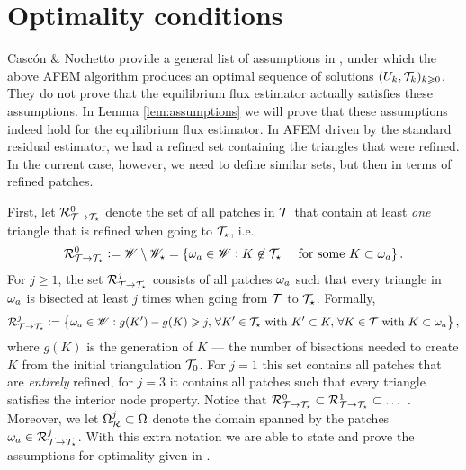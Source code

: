 \documentclass[thesis.tex]{subfiles}
\begin{document}
\section{Optimality conditions}
Casc\'on \& Nochetto provide a general list of assumptions in \cite[\S 4]{cascon2012}, under which the above AFEM algorithm produces
an optimal sequence of solutions $(U_k, \mathcal{T}_k)_{k \geqslant 0}$.
They do not prove that the equilibrium flux estimator actually  satisfies these assumptions.
In Lemma \ref{lem:assumptions} we will prove that these
assumptions indeed hold for the equilibrium flux estimator.
In AFEM driven by the standard residual estimator, we had a refined set containing the triangles that were refined.
In the current case, however, we need to define similar sets, but then in terms of refined patches.

First, let $\mathcal{R}^0_{\mathcal{T} \to \mathcal{T}_\star}$ denote the set of all patches in $\mathcal{T}$ that contain at least \emph{one} triangle that is refined when going to $\mathcal{T}_\star$, i.e.
\[
\mathcal{R}^0_{\mathcal{T} \to \mathcal{T}_\star} := \mathscr{W} \setminus \mathscr{W}_\star =  \set{ \omega_a \in \mathscr{W}:  K \not \in \mathcal{T}_\star\quad \text{ for some }  K \subset \omega_a}.
\]
For $j \geq 1$, the set $\mathcal{R}^j_{\mathcal{T} \to \mathcal{T}_\star}$ consists of all patches $\omega_a$ such that every triangle in $\omega_a$ is bisected at least $j$  times when going from $\mathcal{T}$ to $\mathcal{T}_\star$.
Formally, 
\[
  \mathcal{R}^j_{\mathcal{T} \to \mathcal{T}_\star} := \set{ \omega_a \in \mathscr{W}: g(K') - g(K) \geqslant j,  \, \forall K' \in \mathcal{T}_\star \text{ with } K' \subset K, \, \forall K \in \mathcal{T}\text{ with } K \subset \omega_a},
\]
where $g(K)$ is the generation of $K$ --- the number of bisections needed to create $K$ from the initial triangulation $\mathcal{T}_0$. For $j=1$ this set contains
all patches that are \emph{entirely} refined, for $j=3$ it contains all patches such that every triangle satisfies the interior node property.
Notice that $\mathcal{R}^0_{\mathcal{T} \to \mathcal{T}_\star} \subset \mathcal{R}^1_{\mathcal{T} \to \mathcal{T}_\star} \subset \dots$ . Moreover, we let $\Omega_{\mathcal{R}}^j \subset \Omega$ denote the domain
spanned by the patches $\omega_a \in \mathcal{R}^j_{\mathcal{T} \to \mathcal{T}_\star}$.
With this extra notation we are able to state and prove the assumptions for optimality given in \cite{cascon2012}.
\end{document}
